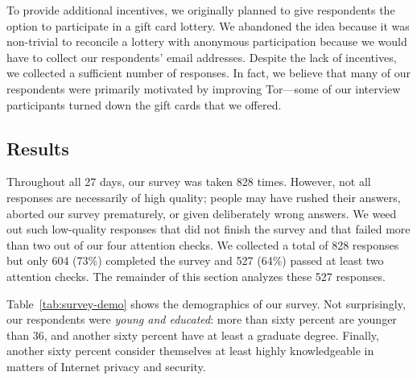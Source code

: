 To provide additional incentives, we originally planned to give respondents the
option to participate in a gift card lottery.  We abandoned the idea because it
was non-trivial to reconcile a lottery with anonymous participation because we
would have to collect our respondents' email addresses.  Despite the lack of
incentives, we collected a sufficient number of responses.  In fact, we believe
that many of our respondents were primarily motivated by improving Tor---some of
our interview participants turned down the gift cards that we offered.

\subsection{Results}
\label{sec:results}

Throughout all 27 days, our survey was taken 828 times.  However, not all
responses are necessarily of high quality; people may have rushed their answers,
aborted our survey prematurely, or given deliberately wrong answers.  We weed
out such low-quality responses that \first did not finish the survey and that
\second failed more than two out of our four attention checks.  We collected a
total of 828 responses but only 604 (73\%) completed the survey and 527 (64\%)
passed at least two attention checks.  The remainder of this section analyzes
these 527 responses.

Table~\ref{tab:survey-demo} shows the demographics of our survey.  Not
surprisingly, our respondents were \emph{young and educated}: more than sixty
percent are younger than 36, and another sixty percent have at least a graduate
degree.  Finally, another sixty percent consider themselves at least highly
knowledgeable in matters of Internet privacy and security.

